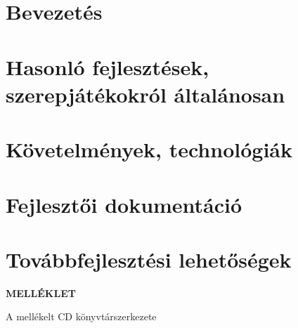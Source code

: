 \documentclass[a4paper,oneside,10pt]{report}
\begin{document}
\chapter{Bevezetés}
\label{bev}


\chapter{Hasonló fejlesztések, szerepjátékokról általánosan}
\label{bem}


\chapter{Követelmények, technológiák}
\label{kovetelmeny}


\chapter{Fejlesztői dokumentáció}
\label{devmanual}


\chapter{Továbbfejlesztési lehetőségek}
\label{tovabbfejlesztes}









\newpage

\Large
\begin{center}
	\textbf{MELLÉKLET}
\end{center}
\normalsize
\noindent
A mellékelt CD könyvtárszerkezete
\end{document}
